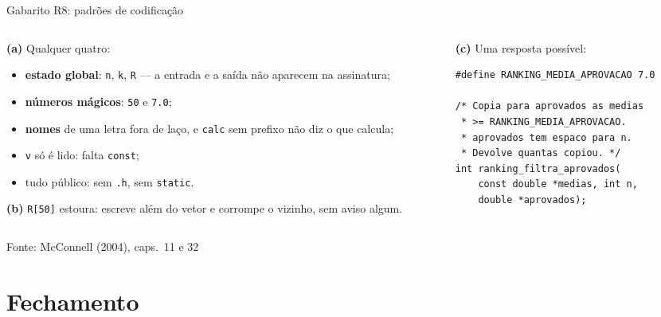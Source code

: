 \documentclass[aspectratio=169]{beamer}
\newcommand{\fonte}[1]{\vfill\hfill{\scriptsize\textcolor{UFSGray}{Fonte: #1}}}
\begin{document}
\begin{frame}[fragile]{Gabarito R8: padrões de codificação}
  \begin{columns}[T]
    \begin{column}{0.50\textwidth}
      \scriptsize
      \textbf{(a)} Qualquer quatro:
      \begin{itemize}
        \item \textbf{estado global}: \texttt{n}, \texttt{k}, \texttt{R} ---
          a entrada e a saída não aparecem na assinatura;
        \item \textbf{números mágicos}: \texttt{50} e \texttt{7.0};
        \item \textbf{nomes} de uma letra fora de laço, e \texttt{calc}
          sem prefixo não diz o que calcula;
        \item \texttt{v} só é lido: falta \texttt{const};
        \item tudo público: sem \texttt{.h}, sem \texttt{static}.
      \end{itemize}
      \textbf{(b)} \texttt{R[50]} estoura: escreve além do vetor e corrompe
      o vizinho, sem aviso algum.
    \end{column}
    \begin{column}{0.46\textwidth}
      \scriptsize\textbf{(c)} Uma resposta possível:
\begin{lstlisting}[style=tinyC]
#define RANKING_MEDIA_APROVACAO 7.0

/* Copia para aprovados as medias
 * >= RANKING_MEDIA_APROVACAO.
 * aprovados tem espaco para n.
 * Devolve quantas copiou. */
int ranking_filtra_aprovados(
    const double *medias, int n,
    double *aprovados);
\end{lstlisting}
    \end{column}
  \end{columns}
  \fonte{McConnell (2004), caps.~11 e 32~\cite{mcconnell2004code}}
\end{frame}

\section*{Fechamento}
\end{document}
